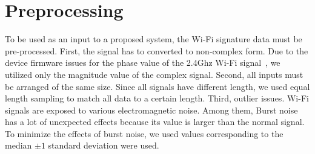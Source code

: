 \label{chp:Method}
\section{Preprocessing}
\label{sec:preprocessing}
To be used as an input to a proposed system, the Wi-Fi signature data must be pre-processed.
First, the signal has to converted to non-complex form. Due to the device firmware issues for the phase value of the 2.4Ghz Wi-Fi signal~\cite{wang2015understanding}, we utilized only the magnitude value of the complex signal.
Second, all inputs must be arranged of the same size. Since all signals have different length, we used equal length sampling to match all data to a certain length.
Third, outlier issues. Wi-Fi signals are exposed to various electromagnetic noise. Among them, Burst noise~\cite{wang2015understanding} has a lot of unexpected effects because its value is larger than the normal signal. To minimize the effects of burst noise, we used values corresponding to the median $\pm1$ standard deviation were used.
